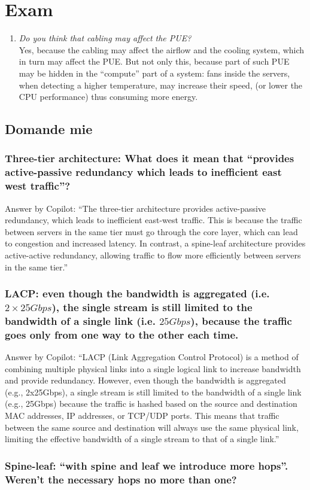 \chapter{Exam}

\begin{enumerate}
   \item 
   \textit{Do you think that cabling may affect the PUE?}\\
   Yes, because the cabling may affect the airflow and the cooling system, which in turn may affect the PUE.
   But not only this, because part of such PUE may be hidden in the ``compute'' part of a system:
   fans inside the servers, when detecting a higher temperature, may increase their speed, (or lower the CPU performance) thus consuming more energy.
\end{enumerate}


\section{Domande mie}

\subsection{Three-tier architecture: What does it mean that ``provides active-passive redundancy which leads to inefficient east west traffic''?}

Answer by Copilot: 
``The three-tier architecture provides active-passive redundancy, which leads to inefficient east-west traffic. This is because the traffic between servers in the same tier must go through the core layer, which can lead to congestion and increased latency. In contrast, a spine-leaf architecture provides active-active redundancy, allowing traffic to flow more efficiently between servers in the same tier.'' 
   

\subsection{LACP: even though the bandwidth is aggregated (i.e. $2\times 25Gbps$), the single stream is still limited to the bandwidth of a single link (i.e. $25Gbps$), because the traffic goes only from one way to the other each time.}

Answer by Copilot: 
``LACP (Link Aggregation Control Protocol) is a method of combining multiple physical links into a single logical link to increase bandwidth and provide redundancy. However, even though the bandwidth is aggregated (e.g., 2x25Gbps), a single stream is still limited to the bandwidth of a single link (e.g., 25Gbps) because the traffic is hashed based on the source and destination MAC addresses, IP addresses, or TCP/UDP ports. This means that traffic between the same source and destination will always use the same physical link, limiting the effective bandwidth of a single stream to that of a single link.''

\subsection{Spine-leaf: ``with spine and leaf we introduce \textbf{more hops}''. Weren't the necessary hops no more than one?}
